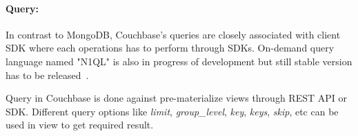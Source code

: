 \par
\paragraph{Query:}
 In contrast to MongoDB,  Couchbase's queries are closely associated with client SDK where each operations has to perform through SDKs. On-demand query language  named "N1QL" is also in  progress of development but still stable version has to be released~\cite{couchbasen1ql}.
\par
 Query in Couchbase is done against pre-materialize views through REST API or SDK. Different query options like \textit{limit}, \textit{group\_level}, \textit{key}, \textit{keys}, \textit{skip}, etc can be used in view to get required result. 
 
   
 
 
 
 
 
 
 
 
 
 
 
 
 
 
 
 
 
 
 
 
 
 
 

	